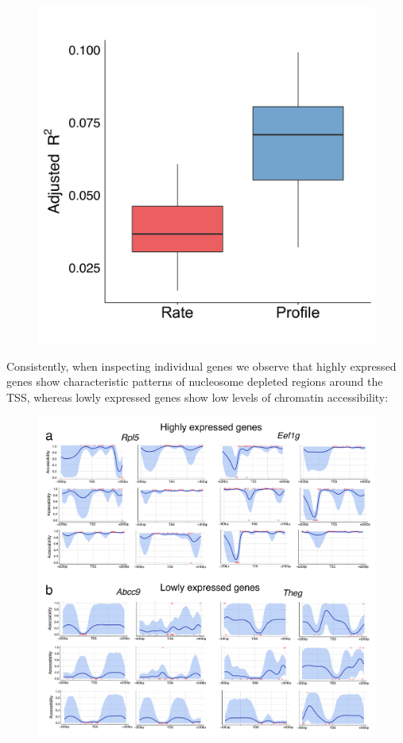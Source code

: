 \begin{figure}[H]
	\centering
	\includegraphics[width=0.65\linewidth]{scNMT_profiles_prediction}
	\caption[]{}
	\label{fig:scnmt_profiles_prediction}
\end{figure}

Consistently, when inspecting individual genes we observe that highly expressed genes show characteristic patterns of nucleosome depleted regions around the TSS, whereas lowly expressed genes show low levels of chromatin accessibility:

\begin{figure}[H]
	\centering
	\includegraphics[width=0.9\linewidth]{scNMT_profiles_expr}
	\caption[]{}
	\label{fig:scnmt_profiles_highexpr}
\end{figure}

